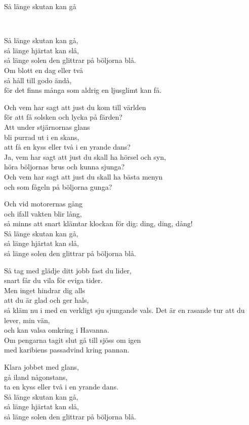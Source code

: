 \begin{song}{Så länge skutan kan gå}
	
	
	\\

	Så länge skutan kan gå,\\
	så länge hjärtat kan slå,\\
	så länge solen den glittrar på böljorna blå.\\
	Om blott en dag eller två\\
	så håll till godo ändå,\\
	för det finns många som aldrig en ljusglimt kan få.
	
	Och vem har sagt att just du kom till världen\\
	för att få solsken och lycka på färden?\\
	Att under stjärnornas glans\\
	bli purrad ut i en skans,\\
	att få en kyss eller två i en yrande dans?\\
	Ja, vem har sagt att just du skall ha hörsel och syn,\\
	höra böljornas brus och kunna sjunga?\\
	Och vem har sagt att just du skall ha bästa menyn\\
	och som fågeln på böljorna gunga?
	
	Och vid motorernas gång\\
	och ifall vakten blir lång,\\
	så minns att snart klämtar klockan för dig: ding, ding, dång!\\
	Så länge skutan kan gå,\\
	så länge hjärtat kan slå,\\
	så länge solen den glittrar på böljorna blå.
	
	Så tag med glädje ditt jobb fast du lider,\\
	snart får du vila för eviga tider.\\
	Men inget hindrar dig alls\\
	att du är glad och ger hals,\\
	så kläm nu i med en verkligt sju sjungande vals.
	Det är en rasande tur att du lever, min vän,\\
	och kan valsa omkring i Havanna.\\
	Om pengarna tagit slut gå till sjöss om igen\\
	med karibiens passadvind kring pannan.
	
	Klara jobbet med glans,\\
	gå iland någonstans,\\
	ta en kyss eller två i en yrande dans.\\
	Så länge skutan kan gå,\\
	så länge hjärtat kan slå,\\
	så länge solen den glittrar på böljorna blå.
	
\end{song}
